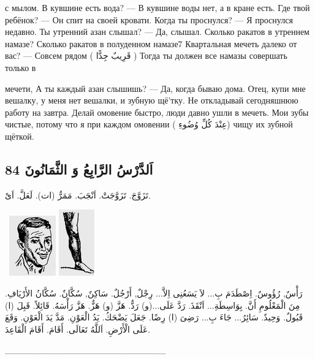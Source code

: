 \documentclass[a5paper]{article}
\begin{document}
с мылом. В кувшине есть вода? — В кувшине воды нет, а в кране есть. Где твой ребёнок? — Он спит на своей кровати. Когда ты проснулся? — Я проснулся недавно. Ты утренний азан слышал? — Да, слышал. Сколько ракатов в утреннем намазе? Сколько ракатов в полуденном намазе7 Квартальная мечеть далеко от вас? — Совсем рядом ( قَرِيبٌ جِدًّا ) Тогда ты должен все намазы совершать только в

мечети, А ты каждый азан слышишь? — Да, когда бываю дома. Отец, купи мне вешалку, у меня нет вешалки, и зубную щё'тку. Не откладывай сегодняшнюю работу на завтра. Делай омовение быстро, люди давно ушли в мечеть. Мои зубы чистые, потому что я при каждом омовении ( عِنْدَ كُلِّ وُضُوءِ) чищу их зубной щёткой.

\subsection{اَلدَّرْسُ الرَّابِعُ وَ الثَّمَانُونَ 84}
تَزَوَّجَ. تَزَوَّجَتْ. اَنْجَبَ. مَمَرٌّ (ات). لَعَلَّ. اَىْ. 

\  \includegraphics[width=0.7917in,height=1.0209in]{images/MuhammadBagauddinprettified-img247.png}   \includegraphics[width=0.6043in,height=1.1252in]{images/MuhammadBagauddinprettified-img248.png} 

رَأْسٌ, رُؤُوسٌ. اِصْطَدَمَ بِ... لاَ يَسَعُنِى اِلاَّ... رِجْلٌ, أَرْجُلٌ. سَاكِنٌ, سُكَّانٌ. سُكَّانُ الأَرْيَافِ. مِنَ الْمَعْلُومِ أَنَّ. بِوَاسِطَةِ... اَنْقَذَ. رَدَّ عَلَى...(و) رَدٌّ. هَزَّ (و) هَزٌّ. هَزَّ رَأْسَهُ. قَائِلاً. قَبِلَ (ا) قَبُولٌ. وَحِيدٌ. سَائِرُ... جَاءَ بِ... رَضِىَ (ا) رِضًا. جَعَلَ يَضْحَكُ. يَدُ الْعَوْنِ. مَدَّ يَدَ الْعَوْنِ. وَقَعَ عَلَى الْأَرْضِ. اَللَّهُ تَعَالَى. أَقَامَ. أَقَامَ الْقَاعِدَ.

\_\_\_\_\_\_\_\_\_\_\_\_\_\_\_\_\_\_\_\_\_\_\_\_\_
\end{document}
